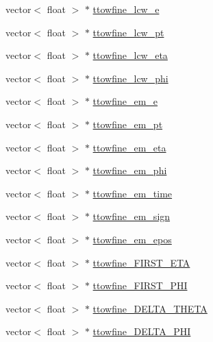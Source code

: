 \begin{DoxyCompactItemize}
\item 
vector$<$ float $>$ $\ast$ \hyperlink{classJetAnalysisExample_a7dd5983008eda784092fbb15ba19141c}{ttowfine\+\_\+lcw\+\_\+e}
\item 
vector$<$ float $>$ $\ast$ \hyperlink{classJetAnalysisExample_a0f5870d6f1558677810ed4a5d3f7a8b5}{ttowfine\+\_\+lcw\+\_\+pt}
\item 
vector$<$ float $>$ $\ast$ \hyperlink{classJetAnalysisExample_a6d41b5d86b194bc23b6785b95f1f8ba9}{ttowfine\+\_\+lcw\+\_\+eta}
\item 
vector$<$ float $>$ $\ast$ \hyperlink{classJetAnalysisExample_a08345f2de51159c59e024d48f11615d2}{ttowfine\+\_\+lcw\+\_\+phi}
\item 
vector$<$ float $>$ $\ast$ \hyperlink{classJetAnalysisExample_a8ca3350c85dc403375eec3db4c6e853c}{ttowfine\+\_\+em\+\_\+e}
\item 
vector$<$ float $>$ $\ast$ \hyperlink{classJetAnalysisExample_acc4d8b8258e4bc51380cfd667e49618d}{ttowfine\+\_\+em\+\_\+pt}
\item 
vector$<$ float $>$ $\ast$ \hyperlink{classJetAnalysisExample_a0df7b4ba0aba4398a52278aff2d07a76}{ttowfine\+\_\+em\+\_\+eta}
\item 
vector$<$ float $>$ $\ast$ \hyperlink{classJetAnalysisExample_a42e7457cc73d7cb05bf3442299e92c39}{ttowfine\+\_\+em\+\_\+phi}
\item 
vector$<$ float $>$ $\ast$ \hyperlink{classJetAnalysisExample_abdbe8ac76323bae7c1a5ce4c7cacda6e}{ttowfine\+\_\+em\+\_\+time}
\item 
vector$<$ float $>$ $\ast$ \hyperlink{classJetAnalysisExample_a01c1b36f8a0189470db9f80b456e9df8}{ttowfine\+\_\+em\+\_\+sign}
\item 
vector$<$ float $>$ $\ast$ \hyperlink{classJetAnalysisExample_a9dedc21eacd73f2a9f8f7d4e954aed41}{ttowfine\+\_\+em\+\_\+epos}
\item 
vector$<$ float $>$ $\ast$ \hyperlink{classJetAnalysisExample_a3f041bfe442596e1b79483f901190d55}{ttowfine\+\_\+\+F\+I\+R\+S\+T\+\_\+\+E\+TA}
\item 
vector$<$ float $>$ $\ast$ \hyperlink{classJetAnalysisExample_ad85d072b18f24a4b8e1cb9900517a4be}{ttowfine\+\_\+\+F\+I\+R\+S\+T\+\_\+\+P\+HI}
\item 
vector$<$ float $>$ $\ast$ \hyperlink{classJetAnalysisExample_a44926f4f7ede0d5c5283e72a0ea1314a}{ttowfine\+\_\+\+D\+E\+L\+T\+A\+\_\+\+T\+H\+E\+TA}
\item 
vector$<$ float $>$ $\ast$ \hyperlink{classJetAnalysisExample_a6018e3ac02440b8fe6ecfb332e51bcf7}{ttowfine\+\_\+\+D\+E\+L\+T\+A\+\_\+\+P\+HI}

\end{DoxyCompactItemize}
